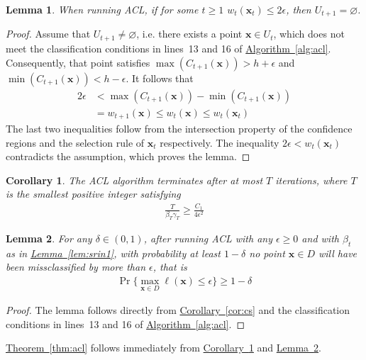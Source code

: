 \documentclass{article}
\def\*#1{\bm{#1}}
\newcommand{\algoref}[1]{\hyperref[#1]{\mbox{Algorithm~\ref*{#1}}}}
\newcommand{\theoremref}[1]{\hyperref[#1]{\mbox{Theorem~\ref*{#1}}}}
\newcommand{\lemmaref}[1]{\hyperref[#1]{\mbox{Lemma~\ref*{#1}}}}
\newcommand{\corref}[1]{\hyperref[#1]{\mbox{Corollary~\ref*{#1}}}}
\newtheorem{lemma}{Lemma}
\newtheorem{cor}{Corollary}
\begin{document}
\begin{lemma}
When running ACL, if for some $t \geq 1$ $w_t(\*x_t) \leq 2\epsilon$,
then $U_{t+1} = \varnothing$.
\end{lemma}
\begin{proof}
Assume that $U_{t+1} \neq \varnothing$, i.e. there exists a point
$\*x \in U_t$, which does not meet the classification conditions in
lines~13 and 16 of \algoref{alg:acl}. Consequently, that point
satisfies $\max(C_{t+1}(\*x)) > h + \epsilon$ and
$\min(C_{t+1}(\*x)) < h - \epsilon$. It follows that
\begin{align*}
2\epsilon &< \max(C_{t+1}(\*x)) - \min(C_{t+1}(\*x))\\
&= w_{t+1}(\*x) \leq w_t(\*x) \leq w_t(\*x_t)
\end{align*}
The last two inequalities follow from the intersection property of
the confidence regions and the selection rule of $\*x_t$ respectively.
The inequality $2\epsilon < w_t(\*x_t)$ contradicts the assumption, which
proves the lemma.
\end{proof}

\begin{cor}
\label{cor:iter}
The ACL algorithm terminates after at most $T$ iterations, where $T$
is the smallest positive integer satisfying
\begin{align*}
\frac{T}{\beta_T \gamma_T} \geq \frac{C_1}{4\epsilon^2}
\end{align*}
\end{cor}

\begin{lemma}
\label{lem:prob}
For any $\delta \in (0, 1)$, after running ACL with any $\epsilon \geq 0$
and with $\beta_t$ as in \lemmaref{lem:srin1}, with probability at least
$1-\delta$ no point $\*x \in D$ will have been missclassified by more
than $\epsilon$, that is
\begin{align*}
\Pr\{\max_{\*x\in D}\ell(\*x) \leq \epsilon\} \geq 1 - \delta
\end{align*}
\end{lemma}
\begin{proof}
The lemma follows directly from \corref{cor:cs} and the classification
conditions in lines~13 and 16 of \algoref{alg:acl}.
\end{proof}

\theoremref{thm:acl} follows immediately from \corref{cor:iter}
and \lemmaref{lem:prob}.




\end{document}
